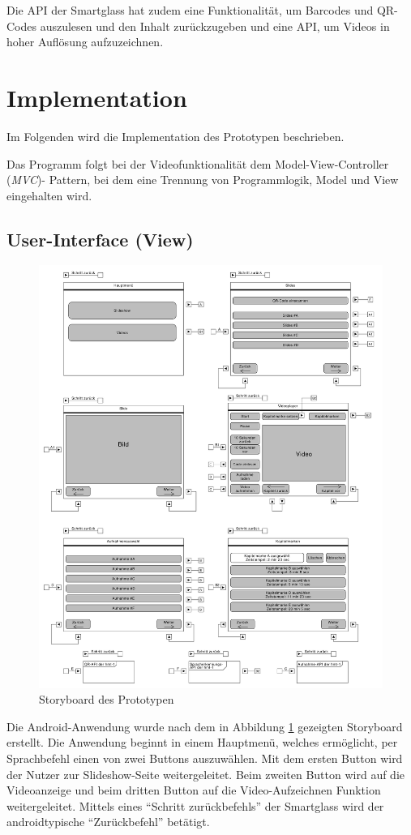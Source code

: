 Die API der Smartglass hat zudem eine Funktionalität, um Barcodes und QR-Codes auszulesen und den Inhalt zurückzugeben und eine API, um Videos in hoher Auflösung aufzuzeichnen. 
%
%
%
%
%
%
\section{Implementation}
\label{sec:Implementation}
Im Folgenden wird die Implementation des Prototypen beschrieben. 

Das Programm folgt bei der Videofunktionalität dem Model-View-Controller (\emph{MVC})- Pattern, bei dem eine Trennung von Programmlogik, Model und View eingehalten wird.
%
%
%
%
%
%
\subsection{User-Interface (View)}
\begin{figure}[htbp]
    \centering
    \includegraphics[width=1\textwidth]{data/bilder/UI-Storyboard.pdf}
    \caption{Storyboard des Prototypen}
    \label{fig:Storyboard_des_Prototypen}
\end{figure}
Die Android-Anwendung wurde nach dem in Abbildung \ref{fig:Storyboard_des_Prototypen} gezeigten Storyboard erstellt. Die Anwendung beginnt in einem Hauptmenü, welches ermöglicht, per Sprachbefehl einen von zwei Buttons auszuwählen. Mit dem ersten Button wird der Nutzer zur Slideshow-Seite weitergeleitet. Beim zweiten Button wird auf die Videoanzeige und beim dritten Button auf die Video-Aufzeichnen Funktion weitergeleitet. Mittels eines \enquote{Schritt zurückbefehls} der Smartglass wird der androidtypische \enquote{Zurückbefehl} betätigt.

